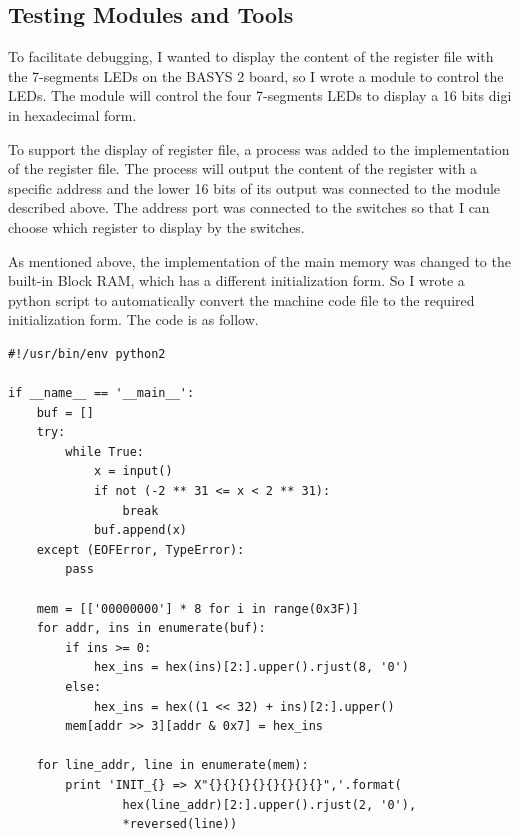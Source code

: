\documentclass[a4paper]{article}
\begin{document}
\subsection{Testing Modules and Tools}
To facilitate debugging, I wanted to display the content of the register file with the 7-segments LEDs on the
BASYS 2 board, so I wrote a module to control the LEDs. The module will control the four 7-segments LEDs to
display a 16 bits digi in hexadecimal form.

To support the display of register file, a process was added to the implementation of the register file.
The process will output the content of the register with a specific address and the lower 16 bits of its output
was connected to the module described above. The address port was connected to the switches so that I can choose
which register to display by the switches.

As mentioned above, the implementation of the main memory was changed to the built-in Block RAM, which has
a different initialization form. So I wrote a python script to automatically convert the machine code file to
the required initialization form. The code is as follow.
\begin{verbatim}
#!/usr/bin/env python2

if __name__ == '__main__':
    buf = []
    try:
        while True:
            x = input()
            if not (-2 ** 31 <= x < 2 ** 31):
                break
            buf.append(x)
    except (EOFError, TypeError):
        pass

    mem = [['00000000'] * 8 for i in range(0x3F)]
    for addr, ins in enumerate(buf):
        if ins >= 0:
            hex_ins = hex(ins)[2:].upper().rjust(8, '0')
        else:
            hex_ins = hex((1 << 32) + ins)[2:].upper()
        mem[addr >> 3][addr & 0x7] = hex_ins

    for line_addr, line in enumerate(mem):
        print 'INIT_{} => X"{}{}{}{}{}{}{}{}",'.format(
                hex(line_addr)[2:].upper().rjust(2, '0'),
                *reversed(line))
\end{verbatim}
\end{document}
